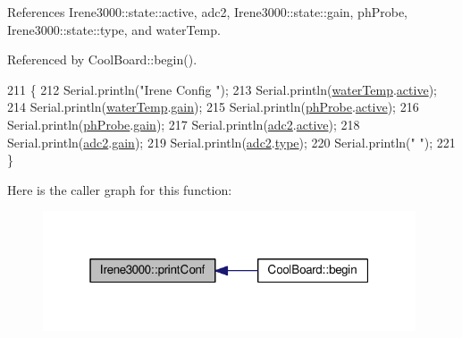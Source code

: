 References Irene3000\+::state\+::active, adc2, Irene3000\+::state\+::gain, ph\+Probe, Irene3000\+::state\+::type, and water\+Temp.



Referenced by Cool\+Board\+::begin().


\begin{DoxyCode}
211 \{
212     Serial.println(\textcolor{stringliteral}{"Irene Config "});
213     Serial.println(\hyperlink{classIrene3000_af05612c78c758ce9db316c75ad937130}{waterTemp}.\hyperlink{structIrene3000_1_1state_af7ff649f20b9a2fb6ca0f949ee9a25ce}{active});
214     Serial.println(\hyperlink{classIrene3000_af05612c78c758ce9db316c75ad937130}{waterTemp}.\hyperlink{structIrene3000_1_1state_a1ecf69d38cb31ecaf6b3602a3f3e93cb}{gain});    
215     Serial.println(\hyperlink{classIrene3000_a997a4ee466fa1d5416e07e444965dc9e}{phProbe}.\hyperlink{structIrene3000_1_1state_af7ff649f20b9a2fb6ca0f949ee9a25ce}{active});
216     Serial.println(\hyperlink{classIrene3000_a997a4ee466fa1d5416e07e444965dc9e}{phProbe}.\hyperlink{structIrene3000_1_1state_a1ecf69d38cb31ecaf6b3602a3f3e93cb}{gain});
217     Serial.println(\hyperlink{classIrene3000_aae3a95a1c83c766cd2f299ce471c337e}{adc2}.\hyperlink{structIrene3000_1_1state_af7ff649f20b9a2fb6ca0f949ee9a25ce}{active});
218     Serial.println(\hyperlink{classIrene3000_aae3a95a1c83c766cd2f299ce471c337e}{adc2}.\hyperlink{structIrene3000_1_1state_a1ecf69d38cb31ecaf6b3602a3f3e93cb}{gain});
219     Serial.println(\hyperlink{classIrene3000_aae3a95a1c83c766cd2f299ce471c337e}{adc2}.\hyperlink{structIrene3000_1_1state_a9897a7e02727db6351d44006eec73799}{type});
220     Serial.println(\textcolor{stringliteral}{" "});
221 \}
\end{DoxyCode}
Here is the caller graph for this function\+:\nopagebreak
\begin{figure}[H]
\begin{center}
\leavevmode
\includegraphics[width=313pt]{classIrene3000_a7bc2414100b5e19eacc6630fa34b2654_icgraph}
\end{center}
\end{figure}
\mbox{\label{classIrene3000_a852a170feea994ea1df01c6b245b5d9a}} 
